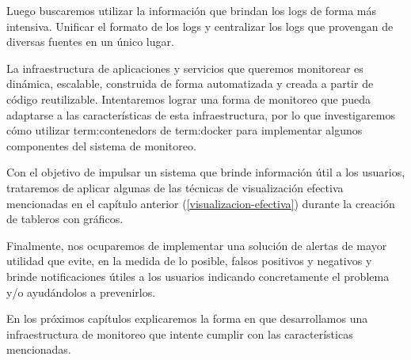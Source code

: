 Luego buscaremos utilizar la información que brindan los logs de forma más
intensiva. Unificar el formato de los logs y centralizar los logs que provengan
de diversas fuentes en un único lugar.

La infraestructura de aplicaciones y servicios que queremos monitorear es
dinámica, escalable, construida de forma automatizada y creada a partir de
código reutilizable. Intentaremos lograr una forma de monitoreo que pueda
adaptarse a las características de esta infraestructura, por lo que
investigaremos cómo utilizar \glspl{term:contenedor} de \gls{term:docker} para
implementar algunos componentes del sistema de monitoreo.

Con el objetivo de impulsar un sistema que brinde información útil a los
usuarios, trataremos de aplicar algunas de las técnicas de visualización
efectiva mencionadas en el capítulo anterior
(\autoref{visualizacion-efectiva}) durante la creación de tableros con
gráficos.

Finalmente, nos ocuparemos de implementar una solución de alertas de mayor
utilidad que evite, en la medida de lo posible, falsos positivos y negativos y
brinde notificaciones útiles a los usuarios indicando concretamente el problema
y/o ayudándolos a prevenirlos.

En los próximos capítulos explicaremos la forma en que desarrollamos una
infraestructura de monitoreo que intente cumplir con las características
mencionadas.

